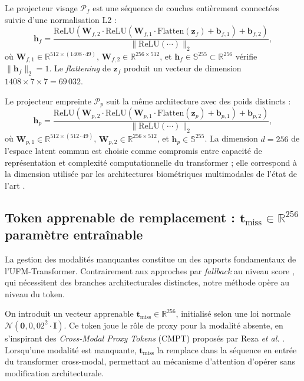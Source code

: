\documentclass[12pt,a4paper]{report}
\begin{document}
Le projecteur visage $\mathcal{P}_f$ est une s\'{e}quence de couches enti\`{e}rement connect\'{e}es suivie d'une normalisation L2 :
\begin{equation}
\label{eq:projecteur-face}
\mathbf{h}_f = \frac{\text{ReLU}(\mathbf{W}_{f,2} \cdot \text{ReLU}(\mathbf{W}_{f,1} \cdot \text{Flatten}(\mathbf{z}_f) + \mathbf{b}_{f,1}) + \mathbf{b}_{f,2})}{\bigl\| \text{ReLU}(\cdots) \bigr\|_2},
\end{equation}
o\`{u} $\mathbf{W}_{f,1} \in \mathbb{R}^{512 \times (1408 \cdot 49)}$, $\mathbf{W}_{f,2} \in \mathbb{R}^{256 \times 512}$, et $\mathbf{h}_f \in \mathbb{S}^{255} \subset \mathbb{R}^{256}$ v\'{e}rifie $\|\mathbf{h}_f\|_2 = 1$. Le \emph{flattening} de $\mathbf{z}_f$ produit un vecteur de dimension $1408 \times 7 \times 7 = 69\,032$.

Le projecteur empreinte $\mathcal{P}_p$ suit la m\^{e}me architecture avec des poids distincts :
\begin{equation}
\mathbf{h}_p = \frac{\text{ReLU}(\mathbf{W}_{p,2} \cdot \text{ReLU}(\mathbf{W}_{p,1} \cdot \text{Flatten}(\mathbf{z}_p) + \mathbf{b}_{p,1}) + \mathbf{b}_{p,2})}{\bigl\| \text{ReLU}(\cdots) \bigr\|_2},
\end{equation}
o\`{u} $\mathbf{W}_{p,1} \in \mathbb{R}^{512 \times (512 \cdot 49)}$, $\mathbf{W}_{p,2} \in \mathbb{R}^{256 \times 512}$, et $\mathbf{h}_p \in \mathbb{S}^{255}$. La dimension $d = 256$ de l'espace latent commun est choisie comme compromis entre capacit\'{e} de repr\'{e}sentation et complexit\'{e} computationnelle du transformer ; elle correspond \`{a} la dimension utilis\'{e}e par les architectures biom\'{e}triques multimodales de l'\'{e}tat de l'art \cite{talreja2021deephashing, yang2024authformer}.

\subsection{Token apprenable de remplacement : $\mathbf{t}_{\text{miss}} \in \mathbb{R}^{256}$ param\`{e}tre entra\^{i}nable}

La gestion des modalit\'{e}s manquantes constitue un des apports fondamentaux de l'UFM-Transformer. Contrairement aux approches par \emph{fallback} au niveau score \cite{elbousty2025multimodal}, qui n\'{e}cessitent des branches architecturales distinctes, notre m\'{e}thode op\`{e}re au niveau du token.

On introduit un vecteur apprenable $\mathbf{t}_{\text{miss}} \in \mathbb{R}^{256}$, initialis\'{e} selon une loi normale $\mathcal{N}(\mathbf{0}, 0{,}02^2 \cdot \mathbf{I})$. Ce token joue le r\^{o}le de proxy pour la modalit\'{e} absente, en s'inspirant des \emph{Cross-Modal Proxy Tokens} (CMPT) propos\'{e}s par Reza \emph{et al.} \cite{reza2025cmpt}. Lorsqu'une modalit\'{e} est manquante, $\mathbf{t}_{\text{miss}}$ la remplace dans la s\'{e}quence en entr\'{e}e du transformer cross-modal, permettant au m\'{e}canisme d'attention d'op\'{e}rer sans modification architecturale.
\end{document}
